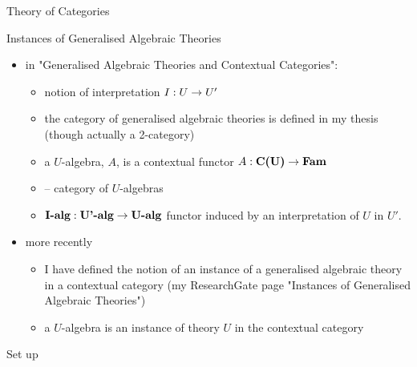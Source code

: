 \begin{frame}{Theory of Categories}
\footnotesize

\end{frame}

\begin{frame}{Instances of Generalised Algebraic Theories}
\begin{itemize}
\item in "Generalised Algebraic Theories and Contextual Categories":
\begin{itemize}
  \item notion of interpretation $I: U \rightarrow U'$ 
  \item the  category of  generalised algebraic theories 
      is defined in my thesis (though actually a 2-category)
  \item  a $U$-algebra, $A$, is a contextual functor $A: \textbf{C(U)} \rightarrow \textbf{Fam}$
  \item {} -- category of $U$-algebras
  \item $\textbf{I-alg}: \textbf{U'-alg} \rightarrow \textbf{U-alg}$ functor induced by an interpretation of $U$ in $U'$.
\end{itemize}
\item more recently 
\begin{itemize}
    \item I have defined the notion of an instance of a generalised algebraic theory in a contextual category
         (my ResearchGate page "Instances of Generalised Algebraic Theories")
    \item a $U$-algebra is an instance of theory $U$ in the contextual category 
\end{itemize}
\end{itemize}
\end{frame}

\begin{frame}{Set up}

\end{frame}


\newcommand{\USigmaA}{U_{\SigmaA}}
\newcommand{\USigmaAalg}{\USigmaA\mhyphen alg}
\newcommand{\SigmaA}{\Sigma A}

